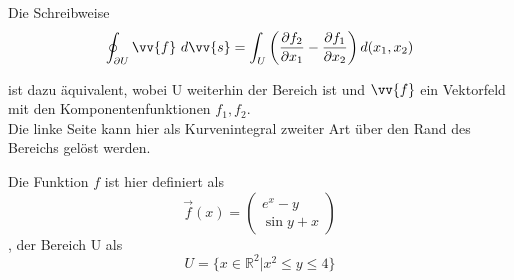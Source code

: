 Die Schreibweise \\

\begin{equation}
    \oint_{\partial U} \vv{f} \ d\vv{s} = \int_U \left(\frac{\partial f_2}{\partial x_1} - \frac{\partial f_1}{\partial x_2}\right)d(x_1,x_2)
\end{equation}

ist dazu äquivalent, wobei U weiterhin der Bereich ist und $\vv{f}$ ein Vektorfeld mit den Komponentenfunktionen $f_1,f_2$.\\
Die linke Seite kann hier als Kurvenintegral zweiter Art über den Rand des Bereichs gelöst werden.

\label{par:green-bsp}
Die Funktion $f$ ist hier definiert als
\begin{equation*}
    \vec{f}(x)=\begin{pmatrix}e^x-y \\ \sin{y} +x\end{pmatrix}
\end{equation*},
der Bereich U als
\begin{equation*}
    U=\{x \in \mathbb{R}^2 | x^2 \leq y \leq 4\}
\end{equation*}


